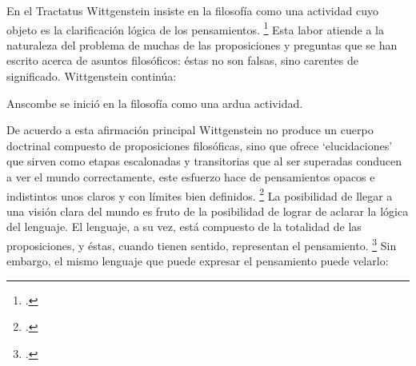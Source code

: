 

En el Tractatus Wittgenstein insiste en
la filosofía como una actividad cuyo objeto es la clarificación lógica de los
pensamientos. \footcite[4.112 p. 52]{tractatus} Esta labor atiende a la
naturaleza del problema de muchas de las proposiciones y preguntas que se han
escrito acerca de asuntos filosóficos: éstas no son falsas, sino carentes de
significado. Wittgenstein continúa: 


Anscombe se inició en la filosofía como una ardua actividad.

De acuerdo a esta afirmación principal Wittgenstein no produce un cuerpo
doctrinal compuesto de proposiciones filosóficas, sino que ofrece
`elucidaciones' que sirven como etapas escalonadas y transitorias que al ser
superadas conducen a ver el mundo correctamente, este esfuerzo hace de
pensamientos opacos e indistintos unos claros y con límites bien definidos.
\footcite[cf. 4.112 y 6.54]{tractatus} La posibilidad de llegar a una visión
clara del mundo es fruto de la posibilidad de lograr de aclarar la lógica del
lenguaje. El lenguaje, a su vez, está compuesto de la totalidad de las
proposiciones, y éstas, cuando tienen sentido, representan el pensamiento.
\footcite[cf. 4 y 4.001]{tractatus} Sin embargo, el mismo lenguaje que puede
expresar el pensamiento puede velarlo:



